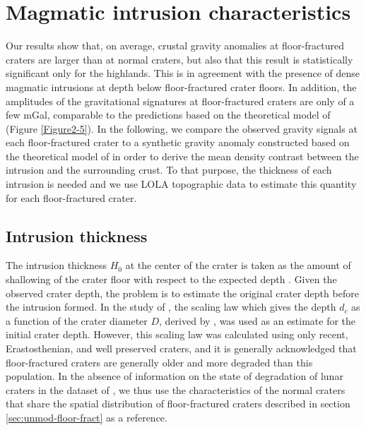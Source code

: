 \section{Magmatic intrusion characteristics}
\label{sec:magm-intr-char}
  
Our  results  show that,  on  average,  crustal gravity  anomalies  at
floor-fractured craters  are larger than  at normal craters,  but also
that   this  result   is  statistically   significant  only   for  the
highlands. This  is in agreement  with the presence of  dense magmatic
intrusions at depth below floor-fractured crater floors.  In addition,
the  amplitudes of  the  gravitational  signatures at  floor-fractured
craters are only of a few mGal, comparable to the predictions based on
the    theoretical    model     of    \citet{Thorey:2014cv}    (Figure
\ref{Figure2-5}).  In  the following, we compare  the observed gravity
signals at each floor-fractured crater  to a synthetic gravity anomaly
constructed based on the theoretical model of \citet{Thorey:2014cv} in
order to  derive the mean  density contrast between the  intrusion and
the  surrounding  crust.   To  that purpose,  the  thickness  of  each
intrusion is needed and we use  LOLA topographic data to estimate this
quantity for each floor-fractured crater.

\subsection{Intrusion thickness}
\label{sec:intrusion-thickness}

The intrusion thickness $H_0$ at the  center of the crater is taken as
the  amount of  shallowing of  the crater  floor with  respect to  the
expected   depth  \citep{Schultz:1976kt,Jozwiak:2012dq}.    Given  the
observed crater depth, the problem  is to estimate the original crater
depth   before    the   intrusion    formed.    In   the    study   of
\citet{Jozwiak:2012dq}, the scaling law which gives the depth $d_c$ as
a function of the crater diameter $D$, derived by \citet{Pike:1974ux},
was used as  an estimate for the initial crater  depth.  However, this
scaling law was calculated using only recent, Erastosthenian, and well
preserved   craters,   and   it   is   generally   acknowledged   that
floor-fractured  craters are  generally older  and more  degraded than
this  population.  In  the  absence  of information  on  the state  of
degradation of lunar craters in the dataset of \citet{Head:2010fy}, we
thus  use the  characteristics of  the normal  craters that  share the
spatial distribution  of floor-fractured craters described  in section
\ref{sec:unmod-floor-fract} as a reference.

